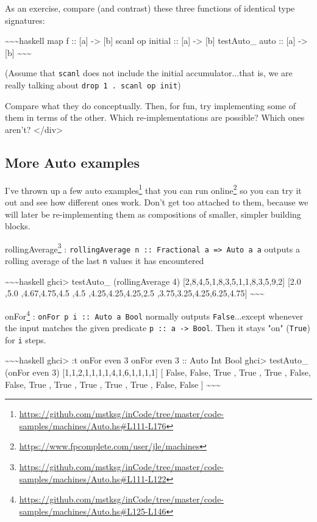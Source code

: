 \documentclass[]{article}
\renewcommand{\href}[2]{#2\footnote{\url{#1}}}
\begin{document}
As an exercise, compare (and contrast) these three functions of identical type
signatures:

\textasciitilde{}\textasciitilde{}\textasciitilde{}haskell map f :: {[}a{]}
-\textgreater{} {[}b{]} scanl op initial :: {[}a{]} -\textgreater{} {[}b{]}
testAuto\_ auto :: {[}a{]} -\textgreater{} {[}b{]}
\textasciitilde{}\textasciitilde{}\textasciitilde{}

(Assume that \texttt{scanl} does not include the initial accumulator...that is,
we are really talking about \texttt{drop\ 1\ .\ scanl\ op\ init})

Compare what they do conceptually. Then, for fun, try implementing some of them
in terms of the other. Which re-implementations are possible? Which ones aren't?
\textless{}/div\textgreater{}

\subsection{More Auto examples}

\href{https://github.com/mstksg/inCode/tree/master/code-samples/machines/Auto.hs\#L111-L176}{I've
thrown up a few auto examples}
\href{https://www.fpcomplete.com/user/jle/machines}{that you can run online} so
you can try it out and see how different ones work. Don't get too attached to
them, because we will later be re-implementing them as compositions of smaller,
simpler building blocks.

\href{https://github.com/mstksg/inCode/tree/master/code-samples/machines/Auto.hs\#L111-L122}{rollingAverage}
: \texttt{rollingAverage\ n\ ::\ Fractional\ a\ =\textgreater{}\ Auto\ a\ a}
outputs a rolling average of the last \texttt{n} values it has encountered

\textasciitilde{}\textasciitilde{}\textasciitilde{}haskell ghci\textgreater{}
testAuto\_ (rollingAverage 4) {[}2,8,4,5,1,8,3,5,1,1,8,3,5,9,2{]} {[}2.0 ,5.0
,4.67,4.75,4.5 ,4.5 ,4.25,4.25,4.25,2.5 ,3.75,3.25,4.25,6.25,4.75{]}
\textasciitilde{}\textasciitilde{}\textasciitilde{}

\href{https://github.com/mstksg/inCode/tree/master/code-samples/machines/Auto.hs\#L125-L146}{onFor}
: \texttt{onFor\ p\ i\ ::\ Auto\ a\ Bool} normally outputs
\texttt{False}...except whenever the input matches the given predicate
\texttt{p\ ::\ a\ -\textgreater{}\ Bool}. Then it stays "on" (\texttt{True}) for
\texttt{i} steps.

\textasciitilde{}\textasciitilde{}\textasciitilde{}haskell ghci\textgreater{} :t
onFor even 3 onFor even 3 :: Auto Int Bool ghci\textgreater{} testAuto\_ (onFor
even 3) {[}1,1,2,1,1,1,1,4,1,6,1,1,1,1{]} {[} False, False, True , True , True ,
False, False, True , True , True , True , True , False, False {]}
\textasciitilde{}\textasciitilde{}\textasciitilde{}
\end{document}
